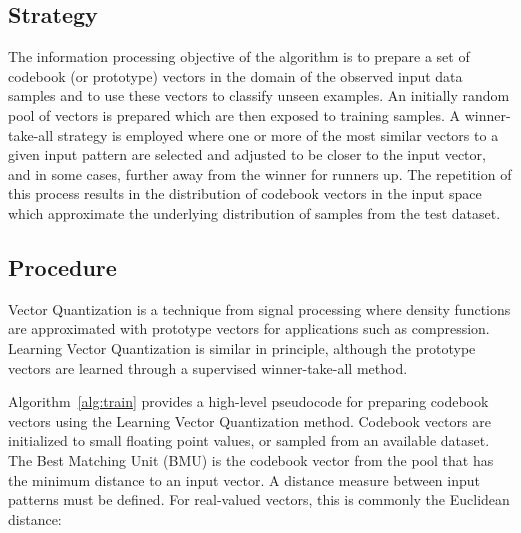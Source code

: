 \subsection{Strategy}
The information processing objective of the algorithm is to prepare a set of codebook (or prototype) vectors in the domain of the observed input data samples and to use these vectors to classify unseen examples.
An initially random pool of vectors is prepared which are then exposed to training samples. A winner-take-all strategy is employed where one or more of the most similar vectors to a given input pattern are selected and adjusted to be closer to the input vector, and in some cases, further away from the winner for runners up. The repetition of this process results in the distribution of codebook vectors in the input space which approximate the underlying distribution of samples from the test dataset.

\subsection{Procedure}
Vector Quantization is a technique from signal processing where density functions are approximated with prototype vectors for applications such as compression. Learning Vector Quantization is similar in principle, although the prototype vectors are learned through a supervised winner-take-all method.

Algorithm~\ref{alg:train} provides a high-level pseudocode for preparing codebook vectors using the Learning Vector Quantization method. 
Codebook vectors are initialized to small floating point values, or sampled from an available dataset. The Best Matching Unit (BMU) is the codebook vector from the pool that has the minimum distance to an input vector. A distance measure between input patterns must be defined. For real-valued vectors, this is commonly the Euclidean distance:

